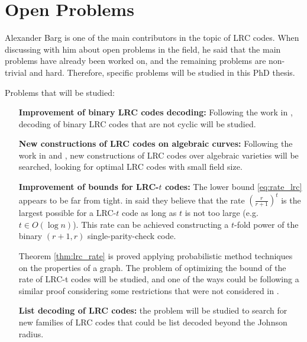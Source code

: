 \chapter{Open Problems}
Alexander Barg is one of the main contributors in the topic of LRC codes. When discussing with him about open problems in the field, he said that the main problems have already been worked on, and the remaining problems are non-trivial and hard. Therefore, specific problems will be studied in this PhD thesis.

\noindent Problems that will be studied:
\begin{itemize}[align = left, leftmargin=*]
\item[\textbf{Improvement of binary LRC codes decoding:}] Following the work in \cite{binary_LRC_decoding2}, decoding of binary LRC codes that are not cyclic will be studied.
\item[\textbf{New constructions of LRC codes on algebraic curves:}] Following the work in \cite{LRC_on_alg_curves} and \cite{LRC_on_alg_curves2}, new constructions of LRC codes over algebraic varieties will be searched, looking for optimal LRC codes with small field size.
\item[\textbf{Improvement of bounds for LRC-$t$ codes:}] The lower bound \ref{eq:rate_lrc} appears to be far from tight. \citeauthor{bounds_on_LRC_t} in \cite{bounds_on_LRC_t} said they believe that the rate $\left(\frac{r}{r+1}\right)^t$ is the largest possible for a LRC-$t$ code as long as $t$ is not too large (e.g. $t \in O(\log n)$). This rate can be achieved constructing a $t$-fold power of the binary $(r+1,r)$ single-parity-check code.

Theorem \ref{thm:lrc_rate} is proved applying probabilistic method techniques on the properties of a graph. The problem of optimizing the bound of the rate of LRC-t codes will be studied, and one of the ways could be following a similar proof considering some restrictions that were not considered in \cite{bounds_on_LRC}.

\item[\textbf{List decoding of LRC codes:}] the problem will be studied to search for new families of LRC codes that could be list decoded beyond the Johnson radius.

\end{itemize}